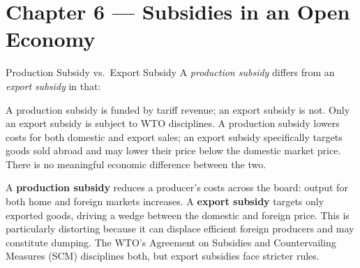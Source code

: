 \documentclass[paper=a5]{scrartcl}
\begin{document}
\section{Chapter 6 — Subsidies in an Open Economy}

\begin{question}[type=mc]{Production Subsidy vs.\ Export Subsidy}
A \emph{production subsidy} differs from an \emph{export subsidy} in that:
\begin{choices}
  \choice        A production subsidy is funded by tariff revenue; an export
                 subsidy is not.
  \choice        Only an export subsidy is subject to WTO disciplines.
  \correctchoice A production subsidy lowers costs for both domestic and
                 export sales; an export subsidy specifically targets goods
                 sold abroad and may lower their price below the domestic
                 market price.
  \choice        There is no meaningful economic difference between the two.
\end{choices}
\begin{solution}
  A \textbf{production subsidy} reduces a producer's costs across the board:
  output for both home and foreign markets increases. A \textbf{export subsidy}
  targets only exported goods, driving a wedge between the domestic and
  foreign price. This is particularly distorting because it can displace
  efficient foreign producers and may constitute dumping. The WTO's Agreement
  on Subsidies and Countervailing Measures (SCM) disciplines both, but export
  subsidies face stricter rules.
\end{solution}
\end{question}
\end{document}
